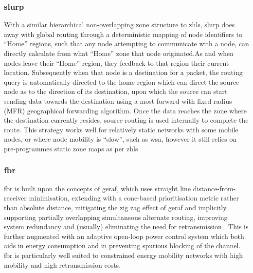 \subsubsection{\gls{slurp}}
With a similar hierarchical non-overlapping zone structure to \gls{zhls}, \gls{slurp} does away with global routing through a deterministic mapping of node identifiers to ``Home'' regions, such that any node attempting to communicate with a node, can directly calculate from what ``Home'' zone that node originated.As and when nodes leave their ``Home'' region, they feedback to that region their current location. Subsequently when that node is a destination for a packet, the routing query is automatically directed to the home region which can direct the source node as to the direction of its destination, upon which the source can start sending data towards the destination using a most forward with fixed radius (MFR) geographical forwarding algorithm. Once the data reaches the zone where the destination currently resides, source-routing is used internally to complete the route. This strategy works well for relatively static networks with some mobile nodes, or where node mobility is ``slow'', such as \gls{wsn}, however it still relies on pre-programmes static zone maps as per \gls{zhls}\cite{Woo2001}
\subsubsection{\gls{fbr}}
\gls{fbr} is built upon the concepts of \gls{geraf}, which uses straight line distance-from-receiver minimisation, extending with a cone-based prioritisation metric rather than absolute distance, mitigating the zig zag effect of \gls{geraf} and implicitly supporting partially overlapping simultaneous alternate routing, improving system redundancy and (usually) eliminating the need for retransmission \cite{Jornet2008}.
This is further augmented with an adaptive open-loop power control system which both aids in energy consumption and in preventing spurious blocking of the channel.
\gls{fbr} is particularly well suited to constrained energy mobility networks with high mobility and high retransmission costs\cite{Noh2012}.


